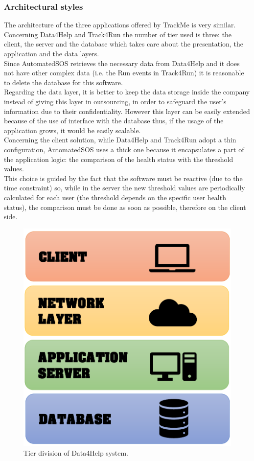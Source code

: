 \documentclass[a4paper]{article}
\begin{document}
\subsubsection{Architectural styles}
The architecture of the three applications offered by TrackMe is very similar.
Concerning Data4Help and Track4Run the number of tier used is three: the client, the server and the database which takes care about the presentation, the application and the data layers. \\
Since AutomatedSOS retrieves the necessary data from Data4Help and it does not have other complex data (i.e. the Run events in Track4Run) it is reasonable to delete the database for this software. \\
Regarding the data layer, it is better to keep the data storage inside the company instead of giving this layer in outsourcing, in order to safeguard the user's information due to their confidentiality. However this layer can be easily extended because of the use of interface with the database thus, if the usage of the application grows, it would be easily scalable. \\
Concerning the client solution, while Data4Help and Track4Run adopt a thin configuration, AutomatedSOS uses a thick one because it encapsulates a part of the application logic: the comparison of the health status with the threshold values.\\
This choice is guided by the fact that the software must be reactive (due to the time constraint) so, while in the server the new threshold values are periodically calculated for each user (the threshold depends on the specific user health status), the comparison must be done as soon as possible, therefore on the client side.

\begin{figure}[H]
    \centering
    \includegraphics[width=\linewidth]{Data4Help-tier-division}
    \caption{Tier division of Data4Help system.}
    \label{fig:my_label}
\end{figure}
\end{document}
